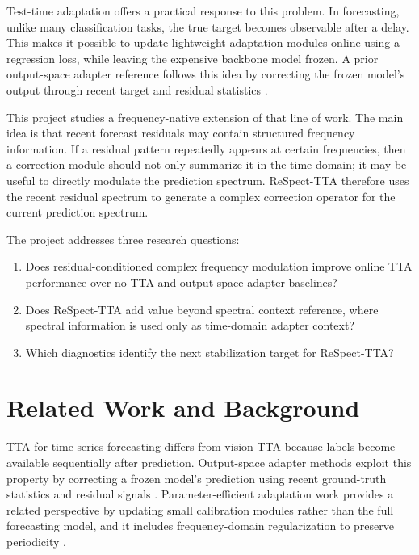 \documentclass[10pt]{article}
\begin{document}
Test-time adaptation offers a practical response to this problem. In forecasting, unlike many classification tasks, the true target becomes observable after a delay. This makes it possible to update lightweight adaptation modules online using a regression loss, while leaving the expensive backbone model frozen. A prior output-space adapter reference follows this idea by correcting the frozen model's output through recent target and residual statistics \cite{im2026adapter}.

This project studies a frequency-native extension of that line of work. The main idea is that recent forecast residuals may contain structured frequency information. If a residual pattern repeatedly appears at certain frequencies, then a correction module should not only summarize it in the time domain; it may be useful to directly modulate the prediction spectrum. ReSpect-TTA therefore uses the recent residual spectrum to generate a complex correction operator for the current prediction spectrum.

The project addresses three research questions:

\begin{enumerate}
  \item Does residual-conditioned complex frequency modulation improve online TTA performance over no-TTA and output-space adapter baselines?
  \item Does ReSpect-TTA add value beyond spectral context reference, where spectral information is used only as time-domain adapter context?
  \item Which diagnostics identify the next stabilization target for ReSpect-TTA?
\end{enumerate}

\section{Related Work and Background}

TTA for time-series forecasting differs from vision TTA because labels become available sequentially after prediction. Output-space adapter methods exploit this property by correcting a frozen model's prediction using recent ground-truth statistics and residual signals \cite{im2026adapter}. Parameter-efficient adaptation work provides a related perspective by updating small calibration modules rather than the full forecasting model, and it includes frequency-domain regularization to preserve periodicity \cite{medeiros2025parameter}.
\end{document}
